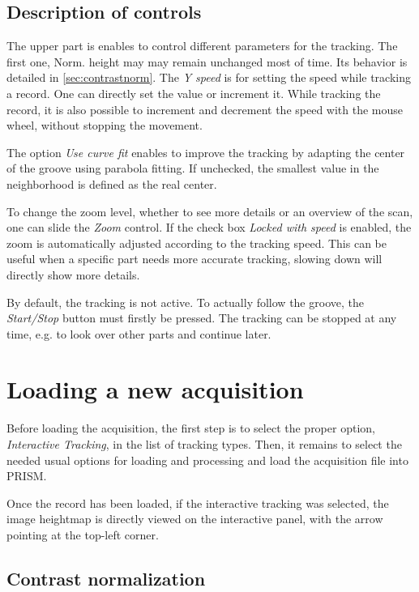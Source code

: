\subsection{Description of controls}

The upper part is enables to control different parameters for the tracking. The first one, Norm. height may may remain unchanged most of time. Its behavior is detailed in \autoref{sec:contrastnorm}. The \emph{Y speed} is for setting the speed while tracking a record. One can directly set the value or increment it. While tracking the record, it is also possible to increment and decrement the speed with the mouse wheel, without stopping the movement.

The option \emph{Use curve fit} enables to improve the tracking by adapting the center of the groove using parabola fitting. If unchecked, the smallest value in the neighborhood is defined as the real center.

To change the zoom level, whether to see more details or an overview of the scan, one can slide the \emph{Zoom} control. If the check box \emph{Locked with speed} is enabled, the zoom is automatically adjusted according to the tracking speed. This can be useful when a specific part needs more accurate tracking, slowing down will directly show more details.

By default, the tracking is not active. To actually follow the groove, the \emph{Start/Stop} button must firstly be pressed. The tracking can be stopped at any time, e.g. to look over other parts and continue later.

\section{Loading a new acquisition}

Before loading the acquisition, the first step is to select the proper option, \emph{Interactive Tracking}, in the list of tracking types. Then, it remains to select the needed usual options for loading and processing and load the acquisition file into PRISM.

Once the record has been loaded, if the interactive tracking was selected, the image heightmap is directly viewed on the interactive panel, with the arrow pointing at the top-left corner.

\subsection{Contrast normalization}
\label{sec:contrastnorm}

